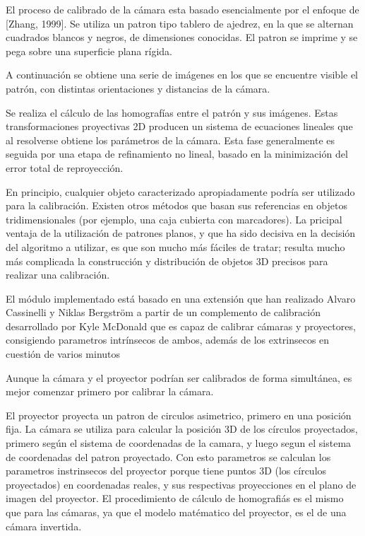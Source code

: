 El proceso de calibrado de la cámara esta basado esencialmente por el enfoque de [Zhang, 1999]. Se utiliza un patron tipo tablero de ajedrez, en la que se alternan cuadrados blancos y negros, de dimensiones conocidas. El patron se imprime y se pega sobre una superficie plana rígida.

A continuación se obtiene una serie de imágenes en los que se encuentre visible el patrón, con distintas orientaciones y distancias de la cámara. 

Se realiza el cálculo de las homografías entre el patrón y sus imágenes. Estas transformaciones proyectivas 2D producen un sistema de ecuaciones lineales que al resolverse obtiene los parámetros de la cámara. Esta fase generalmente es seguida por una etapa de refinamiento no lineal, basado en la minimización del error total de reproyección.

En principio, cualquier objeto caracterizado apropiadamente podría ser utilizado para la calibración. Existen otros métodos que basan sus referencias en objetos tridimensionales (por ejemplo, una caja cubierta con marcadores).  
La pricipal ventaja de la utilización de patrones planos, y que ha sido decisiva en la decisión del algoritmo a utilizar, es que son mucho más fáciles de tratar; resulta mucho más complicada la construcción y distribución de objetos 3D precisos para realizar una calibración.

El módulo implementado está basado en una extensión que han realizado Alvaro Cassinelli y Niklas Bergström a partir de un complemento de calibración desarrollado por Kyle McDonald que es capaz de calibrar cámaras y proyectores, consigiendo parametros intrínsecos de ambos, además de los extrinsecos en cuestión de varios minutos 

Aunque la cámara y el proyector podrían ser calibrados de forma simultánea, es mejor comenzar primero por calibrar la cámara.

El proyector proyecta un patron de circulos asimetrico, primero en una posición fija. La cámara se utiliza para calcular la posición 3D de los círculos proyectados, primero según el sistema de coordenadas de la camara, y luego segun el sistema de coordenadas del patron proyectado. Con esto parametros se calculan los parametros instrinsecos del proyector porque tiene puntos 3D (los círculos proyectados) en coordenadas reales, y sus respectivas proyecciones en el plano de imagen del proyector. El procedimiento de cálculo de homografiás es el mismo que para las cámaras, ya que el modelo matématico del proyector, es el de una cámara invertida. 

